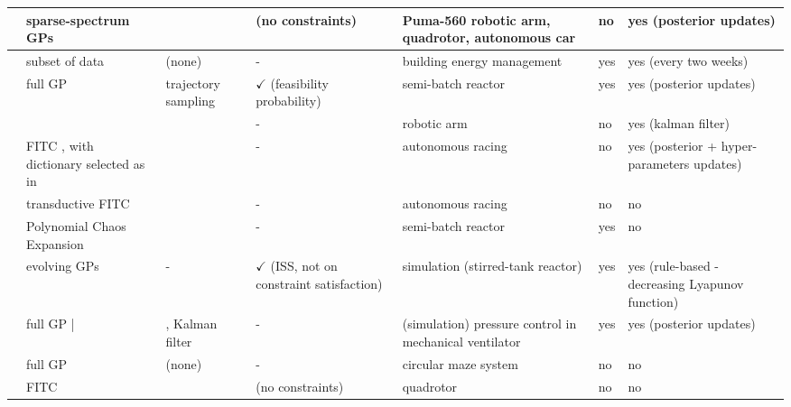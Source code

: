 \begin{table*}
\begin{center}
{{\begin{tabular}{|p{2.2em}|p{9em}|p{6em}|p{8em}|p{14em}|p{4.5em}|p{10em}|}
            \hline
            \cite{pan_prediction_2017} & sparse-spectrum GPs \cite{gijsberts_real-time_2013} & \cite{quinonero-candela_propagation_2003} & (no constraints) & Puma-560 robotic arm, quadrotor, autonomous car & no & yes (posterior updates)\\ 
            \hline
            \cite{jain_learning_2018} & subset of data & (none) & - & building energy management & yes & yes (every two weeks)\\
            \hline
            \cite{bradford_nonlinear_2019, bradford_stochastic_2020} & full GP  & trajectory sampling & $\checkmark$ (feasibility probability) & semi-batch reactor & yes & yes (posterior updates) \\
            \hline       
            \cite{carron_data-driven_2019} & \cite{titsias_variational_2009} & \cite{girard_gaussian_2002} & - & robotic arm & no & yes (kalman filter)\\
            \hline
            \cite{kabzan_learning-based_2019} & FITC \cite{snelson_sparse_2005}, with dictionary selected as in \cite{csato_sparse_2002} & \cite{girard_gaussian_2002} & - & autonomous racing & no & yes (posterior + hyper-parameters updates)\\
            \hline      
            \cite{hewing_cautious_2020} & transductive FITC \cite{snelson_sparse_2005} & \cite{girard_gaussian_2002} & - & autonomous racing & no & no\\
            \hline 
            \cite{bradford_combining_2021} & Polynomial Chaos Expansion & \cite{quinonero-candela_propagation_2003} & - & semi-batch reactor & yes & no \\
            \hline
            \cite{maiworm_online_2021} & evolving GPs \cite{kocijan_modelling_2016} & - & $\checkmark$ (ISS, not on constraint satisfaction) & simulation (stirred-tank reactor) & yes & yes (rule-based - decreasing Lyapunov function)\\
            \hline       
            \cite{mannel_iterative_2021} & full GP | \cite{sarkka_gaussian_2019} & \cite{girard_gaussian_2002}, Kalman filter & - & (simulation) pressure control in mechanical ventilator & yes & yes (posterior updates)\\
            \hline
            \cite{ota_data-efficient_2021} & full GP & (none) & - & circular maze system & no & no\\
            \hline 
            \cite{torrente_data-driven_2021} & FITC \cite{snelson_sparse_2005} & \cite{girard_gaussian_2002} & (no constraints) & quadrotor & no & no \\ 

\end{tabular}}}
\end{center}
\end{table*}
